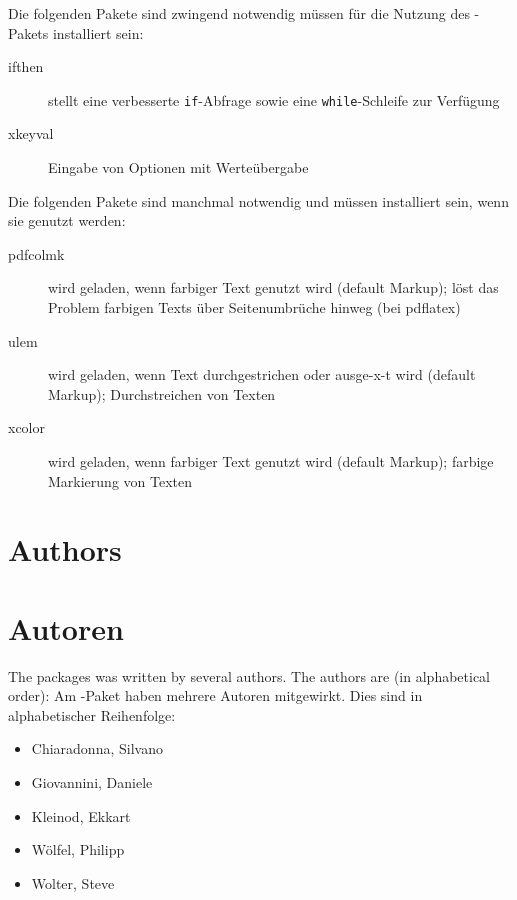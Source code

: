 	Die folgenden Pakete sind zwingend notwendig müssen für die Nutzung des -Pakets installiert sein:
	\begin{description}
		\item [ifthen] stellt eine verbesserte \texttt{if}-Abfrage sowie eine \texttt{while}-Schleife zur Verfügung
		\item [xkeyval] Eingabe von Optionen mit Werteübergabe
	\end{description}

	Die folgenden Pakete sind manchmal notwendig und müssen installiert sein, wenn sie genutzt werden:
	\begin{description}
		\item [pdfcolmk] wird geladen, wenn farbiger Text genutzt wird (default Markup); löst das Problem farbigen Texts über Seitenumbrüche hinweg (bei pdflatex)
		\item [ulem] wird geladen, wenn Text durchgestrichen oder ausge-x-t wird (default Markup); Durchstreichen von Texten
		\item [xcolor] wird geladen, wenn farbiger Text genutzt wird (default Markup); farbige Markierung von Texten
	\end{description}
\fi


\ifENGLISH
\section{Authors}
\fi
\ifGERMAN
	\section{Autoren}
\fi
\label{sec:authors}

\ifENGLISH
The  packages was written by several authors.
The authors are (in alphabetical order):
\fi
\ifGERMAN
	Am -Paket haben mehrere Autoren mitgewirkt.
	Dies sind in alphabetischer Reihenfolge:
\fi
\begin{itemize}
\item Chiaradonna, Silvano
\item Giovannini, Daniele
\item Kleinod, Ekkart
\item Wölfel, Philipp
\item Wolter, Steve
\end{itemize}



\ifENGLISH
